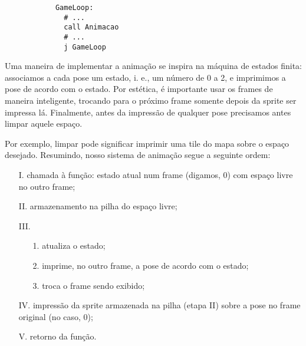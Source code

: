 \documentclass[10pt, a4paper, twoside]{article}
\begin{document}
            \begin{lstlisting}
            GameLoop:
              # ...
              call Animacao
              # ...
              j GameLoop
            \end{lstlisting}
            Uma maneira de implementar a animação se inspira na máquina de estados finita: associamos a cada pose um estado, i. e., um número de 0 a 2, e imprimimos a pose de acordo com o estado.
            Por estética, é importante usar os frames de maneira inteligente, trocando para o próximo frame somente depois da sprite ser impressa lá. 
            Finalmente, antes da impressão de qualquer pose precisamos antes limpar aquele espaço.
            
            Por exemplo, limpar pode significar imprimir uma tile do mapa sobre o espaço desejado.
            Resumindo, nosso sistema de animação segue a seguinte ordem:
            \begin{enumerate}
                \item [I.]
                chamada à função: 
                estado atual num frame (digamos, 0) com espaço livre no outro frame;
                
                \item [II.]
                armazenamento na pilha do espaço livre;
                
                \item [III.]
                \begin{enumerate}
                    \item [1.] atualiza o estado;
                    \item [2.] imprime, no outro frame, a pose de acordo com o estado;
                    \item [3.] troca o frame sendo exibido;
                \end{enumerate}
                
                \item [IV.]
                impressão da sprite armazenada na pilha (etapa II) sobre a pose no frame original (no caso, 0);
                
                \item [V.]
                retorno da função.
            \end{enumerate}
            
            \medskip
            
\end{document}

